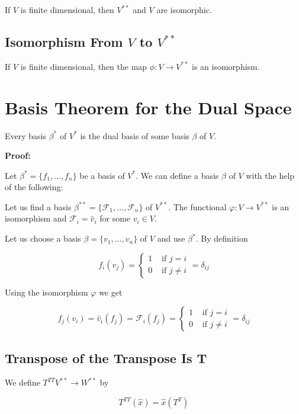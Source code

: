 If \(V\) is finite dimensional, then \(V^{**}\) and \(V\) are isomorphic. 

\subsection{Isomorphism From \(V\) to \(V^{**}\)}

If \(V\) is finite dimensional, then the map \(\phi: V \to V^{**}\) is an isomorphism. 

\section{Basis Theorem for the Dual Space}

Every basis \(\beta^*\) of \(V^*\) is the dual basis of some basis \(\beta\) of \(V\).

\textbf{Proof:}

Let \(\beta^* = \{f_1, \dots, f_n\}\) be a basis of \(V^*\). We can define a basis \(\beta\) of \(V\) with the help of the following:

Let us find a basis \(\beta^{**} = \{\mathcal{F}_1, \dots, \mathcal{F}_n\}\) of \(V^{**}\). The functional \(\varphi: V \to V^{**}\) is 
an isomorphism and \(\mathcal{F}_i = \hat{v}_i\) for some \(v_i \in V\). 

Let us choose a basis \(\beta = \{v_1, \dots, v_n\}\) of \(V\) and use \(\beta^*\). By definition 

\[
    f_i(v_j) = \begin{cases}
        1 & \text{ if } j = i   \\
        0 & \text{ if } j \ne i
    \end{cases} = \delta_{ij}
\]

Using the isomorphism \(\varphi\) we get

\[
    f_j(v_i) = \hat{v}_i(f_j) = \mathcal{F}_i(f_j) = \begin{cases}
        1 & \text{ if } j = i   \\
        0 & \text{ if } j \ne i
    \end{cases} = \delta_{ij} 
\]

\QED

\subsection{Transpose of the Transpose Is T}

We define \(T^{TT} V^{**} \to W^{**}\) by 

\[
    T^{TT}(\hat{x}) = \hat{x}(T^T)
\]

